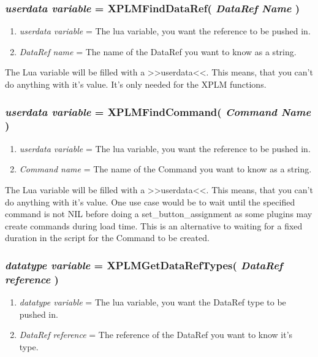 \documentclass[11pt,parskip=half,a4paper]{scrartcl}
\begin{document}
\subsubsection{\emph{userdata variable} = XPLMFindDataRef( \emph{DataRef Name} )}

\begin{enumerate}
	\item \emph{userdata variable} = The lua variable, you want the reference to be pushed in.
	\item \emph{DataRef name} = The name of the DataRef you want to know as a string.
\end{enumerate}

The Lua variable will be filled with a >>userdata<<. This means, that you can't do anything with it's value. It's only needed for the XPLM functions.

\subsubsection{\emph{userdata variable} = XPLMFindCommand( \emph{Command Name} )}

\begin{enumerate}
	\item \emph{userdata variable} = The lua variable, you want the reference to be pushed in.
	\item \emph{Command name} = The name of the Command you want to know as a string.
\end{enumerate}

The Lua variable will be filled with a >>userdata<<. This means, that you can't do anything with it's value. One use case would be to wait until the specified command is not NIL before doing a set\_button\_assignment as some plugins may create commands during load time. This is an alternative to waiting for a fixed duration in the script for the Command to be created. 

\subsubsection{\emph{datatype variable} = XPLMGetDataRefTypes( \emph{DataRef reference} )}

\begin{enumerate}
	\item \emph{datatype variable} = The lua variable, you want the DataRef type to be pushed in.
	\item \emph{DataRef reference} = The reference of the DataRef you want to know it's type.
\end{enumerate}
\end{document}
